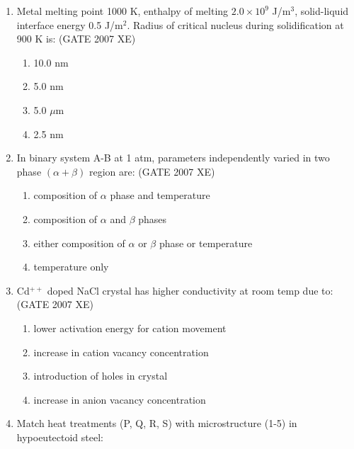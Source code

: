 \documentclass[journal,cmex10]{IEEEtran}
\theoremstyle{remark}
\numberwithin{equation}{enumi}
\numberwithin{figure}{enumi}
\begin{document}
\begin{enumerate}
\newpage
\item Metal melting point 1000 K, enthalpy of melting $2.0 \times 10^9$ J/m$^3$, solid-liquid interface energy 0.5 J/m$^2$. Radius of critical nucleus during solidification at 900 K is:  
\hfill{(GATE 2007 XE)}
\begin{multicols}{4}
\begin{enumerate}
    \item 10.0 nm
    \item 5.0 nm
    \item 5.0 $\mu$m
    \item 2.5 nm
\end{enumerate}
\end{multicols}

\item  In binary system A-B at 1 atm, parameters independently varied in two phase $(\alpha+\beta)$ region are:  
\hfill{(GATE 2007 XE)}
\begin{multicols}{2}
\begin{enumerate}
    \item composition of $\alpha$ phase and temperature
    \item composition of $\alpha$ and $\beta$ phases
    \item either composition of $\alpha$ or $\beta$ phase or temperature
    \item temperature only
\end{enumerate}
\end{multicols}

\item Cd$^{++}$ doped NaCl crystal has higher conductivity at room temp due to:  \\

\hfill{(GATE 2007 XE)}
\begin{multicols}{2}
\begin{enumerate}
    \item lower activation energy for cation movement
    \item increase in cation vacancy concentration
    \item introduction of holes in crystal
    \item increase in anion vacancy concentration
\end{enumerate}
\end{multicols}


\item Match heat treatments (P, Q, R, S) with microstructure (1-5) in hypoeutectoid steel: 


\end{enumerate}
\end{document}
